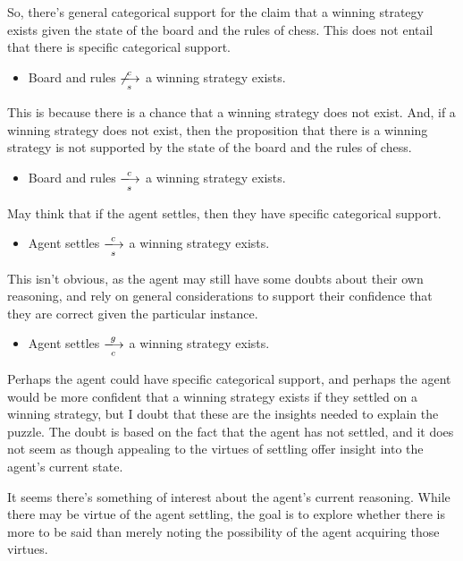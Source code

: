 \documentclass[10pt]{article}
\begin{document}
So, there's general categorical support for the claim that a winning strategy exists given the state of the board and the rules of chess.
This does not entail that there is specific categorical support.

\begin{itemize}
\item Board and rules \(\not\xlongrightarrow[s]{c}\) a winning strategy exists.
\end{itemize}

This is because there is a chance that a winning strategy does not exist.
And, if a winning strategy does not exist, then the proposition that there is a winning strategy is not supported by the state of the board and the rules of chess.

\begin{itemize}
\item Board and rules \(\xlongrightarrow[s]{c}\) a winning strategy exists.
\end{itemize}

May think that if the agent settles, then they have specific categorical support.

\begin{itemize}
\item Agent settles \(\xlongrightarrow[s]{c}\) a winning strategy exists.
\end{itemize}

This isn't obvious, as the agent may still have some doubts about their own reasoning, and rely on general considerations to support their confidence that they are correct given the particular instance.

\begin{itemize}
\item Agent settles \(\xlongrightarrow[c]{g}\) a winning strategy exists.
\end{itemize}

Perhaps the agent could have specific categorical support, and perhaps the agent would be more confident that a winning strategy exists if they settled on a winning strategy, but I doubt that these are the insights needed to explain the puzzle.
The doubt is based on the fact that the agent has not settled, and it does not seem as though appealing to the virtues of settling offer insight into the agent's current state.

It seems there's something of interest about the agent's current reasoning.
While there may be virtue of the agent settling, the goal is to explore whether there is more to be said than merely noting the possibility of the agent acquiring those virtues.
\end{document}
